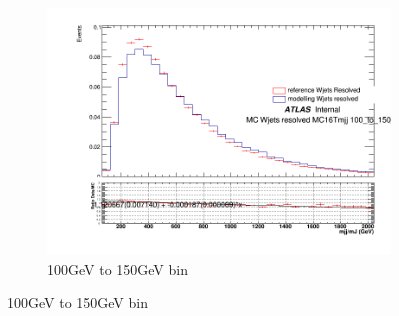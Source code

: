 \begin{figure}[ht]
    \hfill
    \begin{subfigure}[b]{0.3\textwidth}
        \centering
        \includegraphics[width=\textwidth]{figures/mjjreweight1lep/resolved_Wjets100_to_150_GeVMC16T.png}
        \caption{100GeV to 150GeV bin}
        \label{fig:resolved_Wjets100to150}
    \end{subfigure}
    

\end{figure}
